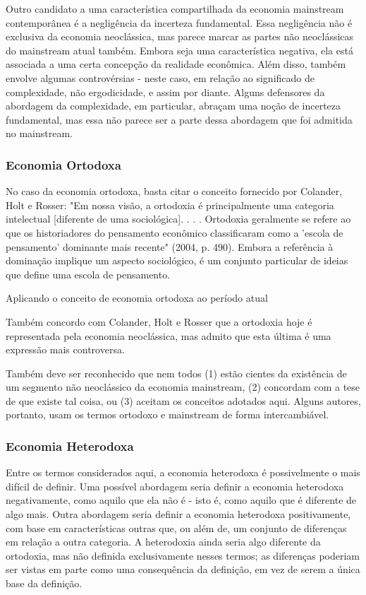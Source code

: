 \documentclass[12pt]{article}
\begin{document}
Outro candidato a uma característica compartilhada da economia mainstream contemporânea é a negligência da incerteza fundamental. Essa negligência não é exclusiva da economia neoclássica, mas parece marcar as partes não neoclássicas do mainstream atual também. Embora seja uma característica negativa, ela está associada a uma certa concepção da realidade econômica. Além disso, também envolve algumas controvérsias - neste caso, em relação ao significado de complexidade, não ergodicidade, e assim por diante. Alguns defensores da abordagem da complexidade, em particular, abraçam uma noção de incerteza fundamental, mas essa não parece ser a parte dessa abordagem que foi admitida no mainstream.

\subsubsection{\textbf{Economia Ortodoxa}}

No caso da economia ortodoxa, basta citar o conceito fornecido por Colander, Holt e Rosser: "Em nossa visão, a ortodoxia é principalmente uma categoria intelectual [diferente de uma sociológica]. . . . Ortodoxia geralmente se refere ao que os historiadores do pensamento econômico classificaram como a 'escola de pensamento' dominante mais recente" (2004, p. 490). Embora a referência à dominação implique um aspecto sociológico, é um conjunto particular de ideias que define uma escola de pensamento.

Aplicando o conceito de economia ortodoxa ao período atual

Também concordo com Colander, Holt e Rosser que a ortodoxia hoje é representada pela economia neoclássica, mas admito que esta última é uma expressão mais controversa.

Também deve ser reconhecido que nem todos (1) estão cientes da existência de um segmento não neoclássico da economia mainstream, (2) concordam com a tese de que existe tal coisa, ou (3) aceitam os conceitos adotados aqui. Alguns autores, portanto, usam os termos ortodoxo e mainstream de forma intercambiável.

\subsubsection{\textbf{Economia Heterodoxa}}

Entre os termos considerados aqui, a economia heterodoxa é possivelmente o mais difícil de definir. Uma possível abordagem seria definir a economia heterodoxa negativamente, como aquilo que ela não é - isto é, como aquilo que é diferente de algo mais. Outra abordagem seria definir a economia heterodoxa positivamente, com base em características outras que, ou além de, um conjunto de diferenças em relação a outra categoria. A heterodoxia ainda seria algo diferente da ortodoxia, mas não definida exclusivamente nesses termos; as diferenças poderiam ser vistas em parte como uma consequência da definição, em vez de serem a única base da definição.
\end{document}

